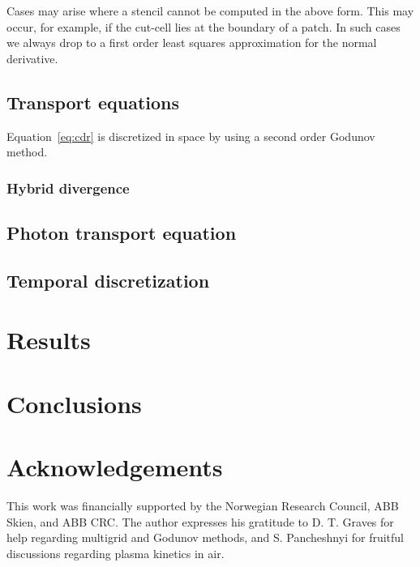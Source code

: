 \documentclass[3p]{elsarticle}
\begin{document}
Cases may arise where a stencil cannot be computed in the above form. This may occur, for example, if the cut-cell lies at the boundary of a patch. In such cases we always drop to a first order least squares approximation for the normal derivative. 

\subsection{Transport equations}
Equation~\eqref{eq:cdr} is discretized in space by using a second order Godunov method. 

\subsubsection{Hybrid divergence}


\subsection{Photon transport equation}

\subsection{Temporal discretization}

\section{Results}

\section{Conclusions}

\section*{Acknowledgements}
This work was financially supported by the Norwegian Research Council, ABB Skien, and ABB CRC. The author expresses his gratitude to D. T. Graves for help regarding multigrid and Godunov methods, and S. Pancheshnyi for fruitful discussions regarding plasma kinetics in air. 
\end{document}
